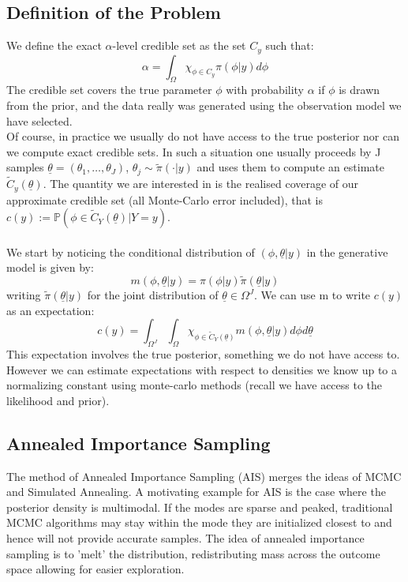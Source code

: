 \documentclass[twoside]{article}
\begin{document}
\subsection{Definition of the Problem}
We define the exact $\alpha$-level credible set as the set $C_y$ such that:
\begin{equation}
	\alpha = \int_{\Omega} \chi_{\phi \in C_y} \pi(\phi | y) d\phi 
\end{equation}
The credible set covers the true parameter $\phi$ with probability $\alpha$ if $\phi$ is drawn from the prior, and the data really was generated using the observation model we have selected. \\
Of course, in practice we usually do not have access to the true posterior nor can we compute exact credible sets. In such a situation one usually proceeds by J samples $\underline{\theta} = (\theta_1,\dots,\theta_J)$, $\theta_j \sim \tilde{\pi}(\cdot | y)$ and uses them to compute an estimate $\tilde{C}_y(\underline{\theta})$. The quantity we are interested in is the realised coverage of our approximate credible set (all Monte-Carlo error included), that is $c(y) := \mathbb{P}(\phi \in \tilde{C}_Y(\underline{\theta}) | Y=y)$.\\ \\
We start by noticing the conditional distribution of $(\phi,\underline{\theta}|y)$ in the generative model is given by:
\begin{equation}
m(\phi,\underline{\theta} | y) = \pi(\phi|y) \tilde{\pi}(\underline{\theta}|y)
\end{equation}
writing $\tilde{\pi}(\underline{\theta}|y)$ for the joint distribution of $\underline{\theta} \in \Omega^J$. 
We can use m to write $c(y)$ as an expectation:
\begin{equation}
c(y) = \int_{\Omega^J}\int_{\Omega} \chi_{\phi \in \tilde{C}_Y(\underline{\theta})}m(\phi,\underline{\theta}|y) d\phi d\underline{\theta}
\end{equation}
This expectation involves the true posterior, something we do not have access to. However we can estimate expectations with respect to densities we know up to a normalizing constant using monte-carlo methods (recall we have access to the likelihood and prior).
\subsection{Annealed Importance Sampling}
The method of Annealed Importance Sampling (AIS) merges the ideas of MCMC and Simulated Annealing. A motivating example for AIS is the case where the posterior density is multimodal. If the modes are sparse and peaked, traditional MCMC algorithms may stay within the mode they are initialized closest to and hence will not provide accurate samples. The idea of annealed importance sampling is to 'melt' the distribution, redistributing mass across the outcome space allowing for easier exploration.
\end{document}
